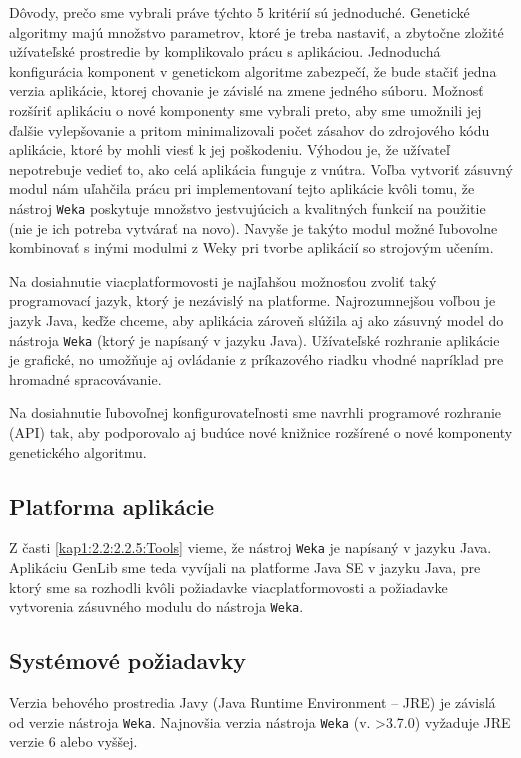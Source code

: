 Dôvody, prečo sme vybrali práve týchto 5 kritérií sú jednoduché.
Genetické algoritmy majú množstvo parametrov, ktoré je treba nastaviť, a zbytočne zložité užívateľské prostredie by komplikovalo prácu s aplikáciou. Jednoduchá konfigurácia komponent v genetickom algoritme zabezpečí, že bude stačiť jedna verzia aplikácie, ktorej chovanie je závislé na zmene jedného súboru. Možnosť rozšíriť aplikáciu o nové komponenty sme vybrali preto, aby sme umožnili jej ďalšie vylepšovanie a pritom minimalizovali počet zásahov do zdrojového kódu aplikácie, ktoré by mohli viesť k jej poškodeniu. Výhodou je, že užívateľ nepotrebuje vedieť to, ako celá aplikácia funguje z vnútra. Voľba vytvoriť zásuvný modul nám uľahčila prácu pri implementovaní tejto aplikácie kvôli tomu, že nástroj \verb|Weka| poskytuje množstvo jestvujúcich a kvalitných funkcií na použitie (nie je ich potreba vytvárať na novo). Navyše je takýto modul možné ľubovolne kombinovať s inými modulmi z Weky pri tvorbe aplikácií so strojovým učením.

Na dosiahnutie viacplatformovosti je najľahšou možnosťou zvoliť taký programovací jazyk, ktorý je nezávislý na platforme.  Najrozumnejšou voľbou je jazyk Java, keďže chceme, aby aplikácia zároveň slúžila aj ako zásuvný model do nástroja \verb|Weka| (ktorý je napísaný v jazyku Java). Užívateľské rozhranie aplikácie je grafické, no umožňuje aj ovládanie z príkazového riadku vhodné napríklad pre hromadné spracovávanie.

Na dosiahnutie ľubovoľnej konfigurovateľnosti sme navrhli programové rozhranie (API) tak, aby podporovalo aj budúce nové knižnice rozšírené o nové komponenty genetického algoritmu.

\subsection{Platforma aplikácie}\label{kap4:4.1:4.1.2:Environment}
Z časti \ref{kap1:2.2:2.2.5:Tools} vieme, že nástroj \verb|Weka| je napísaný v jazyku Java.
Aplikáciu GenLib sme teda vyvíjali na platforme Java SE v jazyku Java, pre ktorý sme sa rozhodli kvôli požiadavke viacplatformovosti a požiadavke vytvorenia zásuvného modulu do nástroja \verb|Weka|.
\subsection{Systémové požiadavky}\label{kap4:4.1:4.1.3:SystemRequirements}
Verzia behového prostredia Javy (Java Runtime Environment -- JRE) je závislá od verzie nástroja \verb|Weka|. Najnovšia verzia nástroja \verb|Weka| (v. >3.7.0) vyžaduje JRE verzie 6 alebo vyššej.

